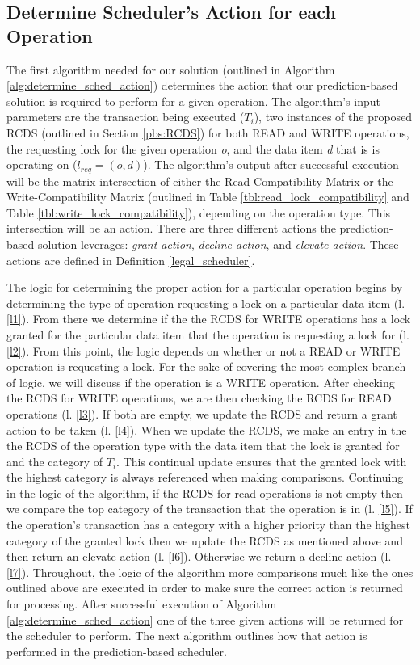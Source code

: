 \subsection{Determine Scheduler's Action for each Operation}
\label{pbs:determine_sched_actions}
The first algorithm needed for our solution (outlined in Algorithm \ref{alg:determine_sched_action}) determines the action that our prediction-based solution is required to perform for a given operation. The algorithm's input parameters are the transaction being executed ($T_{i}$), two instances of the proposed \ac{RCDS} (outlined in Section \ref{pbs:RCDS}) for both READ and WRITE operations, the requesting lock for the given operation \textit{o}, and the data item \textit{d} that is is operating on ($l_{req} = (o,d)$). The algorithm's output after successful execution will be the matrix intersection of either the Read-Compatibility Matrix or the Write-Compatibility Matrix (outlined in Table \ref{tbl:read_lock_compatibility} and Table \ref{tbl:write_lock_compatibility}), depending on the operation type. This intersection will be an action. There are three different actions the prediction-based solution leverages: \textit{grant action}, \textit{decline action}, and \textit{elevate action}. These actions are defined in Definition \ref{legal_scheduler}.

The logic for determining the proper action for a particular operation begins by determining the type of operation requesting a lock on a particular data item (l. \ref{l1}). From there we determine if the the \ac{RCDS} for WRITE operations has a lock granted for the particular data item that the operation is requesting a lock for (l. \ref{l2}). From this point, the logic depends on whether or not a READ or WRITE operation is requesting a lock. For the sake of covering the most complex branch of logic, we will discuss if the operation is a WRITE operation. After checking the \ac{RCDS} for WRITE operations, we are then checking the \ac{RCDS} for READ operations (l. \ref{l3}). If both are empty, we update the \ac{RCDS} and return a grant action to be taken (l. \ref{l4}). When we update the \ac{RCDS}, we make an entry in the the \ac{RCDS} of the operation type with the data item that the lock is granted for and the category of $T_{i}$. This continual update ensures that the granted lock with the highest category is always referenced when making comparisons. Continuing in the logic of the algorithm, if the \ac{RCDS} for read operations is not empty then we compare the top category of the transaction that the operation is in (l. \ref{l5}). If the operation's transaction has a category with a higher priority than the highest category of the granted lock then we update the \ac{RCDS} as mentioned above and then return an elevate action (l. \ref{l6}). Otherwise we return a decline action (l. \ref{l7}). Throughout, the logic of the algorithm more comparisons much like the ones outlined above are executed in order to make sure the correct action is returned for processing. After successful execution of Algorithm \ref{alg:determine_sched_action} one of the three given actions will be returned for the scheduler to perform. The next algorithm outlines how that action is performed in the prediction-based scheduler.


